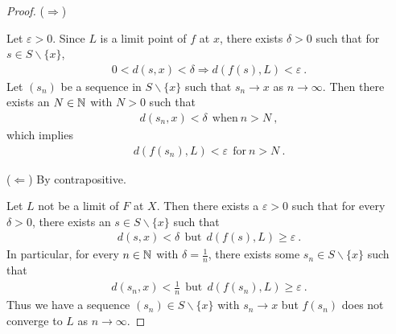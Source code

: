 \begin{questions}


\begin{solution}
  \begin{proof}
($\Rightarrow$) 

Let $\varepsilon > 0$. Since $L$ is a limit point of $f$ at $x$, there exists $\delta > 0$ such that for $s \in S \backslash \{x\}$,
\begin{align*}
0 < d(s,x) < \delta \Rightarrow d(f(s),L) < \varepsilon~.
\end{align*}
Let $(s_n)$ be a sequence in $S \backslash \{x\}$ such that $s_n \rightarrow x$ as $n \rightarrow \infty$. Then there exists an $N \in \mathbb{N}$ with $N >0$ such that
\begin{align*}
d(s_n,x) < \delta ~~\text{when}~n>N~,
\end{align*}
which implies
\begin{align*}
d(f(s_n),L) <\varepsilon~~ \text{for}~n>N~.
\end{align*}

($\Leftarrow$) By contrapositive.

Let $L$ not be a limit of $F$ at $X$. Then there exists a $\varepsilon > 0$ such that for every $\delta > 0$, there exists an $s \in S \backslash \{x\}$ such that
\begin{align*}
d(s,x) < \delta~~\text{but}~~d(f(s),L) \geq \varepsilon~.
\end{align*}
In particular, for every $n \in \mathbb{N}$ with $\delta = \frac{1}{n}$, there exists some $s_n \in S \backslash \{x\}$ such that
\begin{align*}
d(s_n,x) < \frac{1}{n}~~\text{but}~~d(f(s_n),L) \geq \varepsilon~.
\end{align*}
Thus we have a sequence $(s_n) \in S \backslash \{x\}$ with $s_n \rightarrow x$ but $f(s_n)$ does not converge to $L$ as $n \rightarrow \infty$.

\end{proof}
\end{solution}
\end{questions}